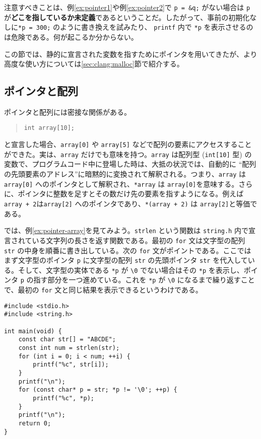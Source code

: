注意すべきことは、例\ref{ex:pointer1}や例\ref{ex:pointer2}で \texttt{p = \&q;} がない場合は \texttt{p} が\textbf{どこを指しているか未定義}であるということだ。したがって、事前の初期化なしに\texttt{*p = 300;} のように書き換えを試みたり、 \texttt{printf} 内で \texttt{*p} を表示させるのは危険である。何が起こるか分からない。

この節では、静的に宣言された変数を指すためにポインタを用いてきたが、より高度な使い方については\ref{sec:clang:malloc}節で紹介する。

\subsection{ポインタと配列}
\label{sec:C:pointer-array}
ポインタと配列には密接な関係がある。
\begin{quote}
    \begin{verbatim}
int array[10];
\end{verbatim}
\end{quote}
と宣言した場合、\texttt{array[0]} や \texttt{array[5]} などで配列の要素にアクセスすることができた。実は、\texttt{array} だけでも意味を持つ。\texttt{array} は配列型 (\texttt{int[10]} 型) の変数で、プログラムコード中に登場した時は、大抵の状況では、自動的に ``配列の先頭要素のアドレス''に暗黙的に変換されて解釈される。つまり、\texttt{array} は \texttt{array[0]} へのポインタとして解釈され、\texttt{*array} は \texttt{array[0]}を意味する。さらに、ポインタに整数を足すとその数だけ先の要素を指すようになる。例えば\texttt{array + 2}は\texttt{array[2]} へのポインタであり、\texttt{*(array + 2)} は \texttt{array[2]}と等価である。

では、例\ref{ex:pointer-array}を見てみよう。\texttt{strlen} という関数は \texttt{string.h} 内で宣言されている文字列の長さを返す関数である。最初の \texttt{for} 文は文字型の配列 \texttt{str} の中身を順番に書き出している。次の \texttt{for} 文がポイントである。ここではまず文字型のポインタ \texttt{p} に文字型の配列 \texttt{str} の先頭ポインタ \texttt{str} を代入している。そして、文字型の実体である \texttt{*p} が \texttt{\textbackslash 0} でない場合はその \texttt{*p} を表示し、ポインタ \texttt{p} の指す部分を一つ進めている。これを \texttt{*p} が \texttt{\textbackslash 0} になるまで繰り返すことで、最初の \texttt{for} 文と同じ結果を表示できるというわけである。
\begin{reidai}\label{ex:pointer-array}
    \begin{verbatim}
#include <stdio.h>
#include <string.h>

int main(void) {
    const char str[] = "ABCDE";
    const int num = strlen(str);
    for (int i = 0; i < num; ++i) {
        printf("%c", str[i]);
    }
    printf("\n");
    for (const char* p = str; *p != '\0'; ++p) {
        printf("%c", *p);
    }
    printf("\n");
    return 0;
}
\end{verbatim}
\end{reidai}


